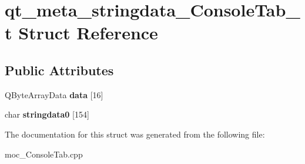 \hypertarget{structqt__meta__stringdata__ConsoleTab__t}{}\section{qt\+\_\+meta\+\_\+stringdata\+\_\+\+Console\+Tab\+\_\+t Struct Reference}
\label{structqt__meta__stringdata__ConsoleTab__t}
\subsection*{Public Attributes}
\begin{DoxyCompactItemize}
\item 
\mbox{\label{structqt__meta__stringdata__ConsoleTab__t_ad8ce80446f0554c014d086e889a3c41b}} 
Q\+Byte\+Array\+Data {\bfseries data} \mbox{[}16\mbox{]}
\item 
\mbox{\label{structqt__meta__stringdata__ConsoleTab__t_aee5160931d50cc0882dfa17fa9051b12}} 
char {\bfseries stringdata0} \mbox{[}154\mbox{]}
\end{DoxyCompactItemize}


The documentation for this struct was generated from the following file\+:\begin{DoxyCompactItemize}
\item 
moc\+\_\+\+Console\+Tab.\+cpp\end{DoxyCompactItemize}
